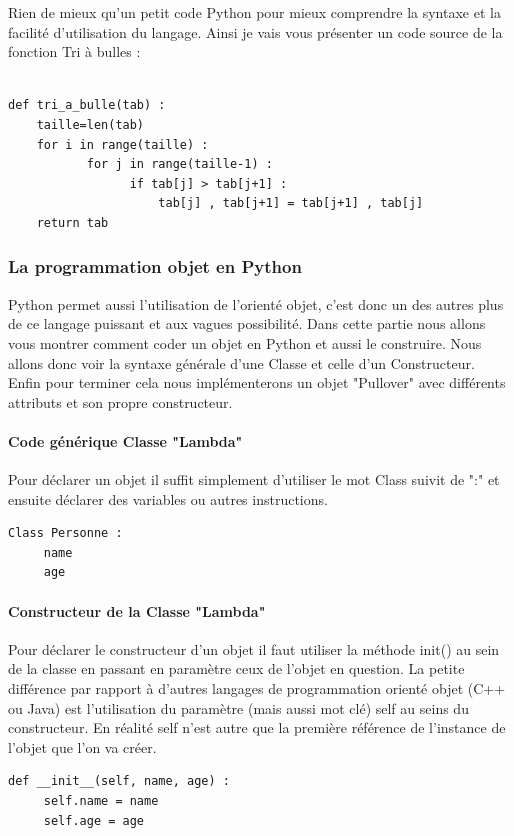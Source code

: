 \documentclass[a4paper, 12pt, twoside]{article}
\begin{document}
Rien de mieux qu'un petit code Python pour mieux comprendre la syntaxe et la facilité d'utilisation du langage. Ainsi je vais vous présenter un code source de la fonction \textsf{Tri à bulles} :

\begin{verbatim}

def tri_a_bulle(tab) :
    taille=len(tab)
    for i in range(taille) :
           for j in range(taille-1) : 
                 if tab[j] > tab[j+1] :
                     tab[j] , tab[j+1] = tab[j+1] , tab[j]
    return tab
\end{verbatim}

\subsubsection{La programmation objet en Python}
Python permet aussi l'utilisation de l'orienté objet, c'est donc un des autres plus de ce langage puissant et aux vagues possibilité. Dans cette partie nous allons vous montrer comment coder un objet en Python et aussi le construire. Nous allons donc voir la syntaxe générale d'une  \textsf{Classe} et celle d'un \textsf{Constructeur}. Enfin pour terminer cela nous implémenterons un objet "Pullover" avec différents attributs et son propre constructeur.
\paragraph{Code générique Classe "Lambda"}
Pour déclarer un objet il suffit simplement d'utiliser le mot Class suivit de ":" et ensuite déclarer des variables ou autres instructions.
\begin{verbatim}
Class Personne : 
     name
     age
\end{verbatim}
\paragraph{Constructeur de la Classe "Lambda"}{Pour déclarer le constructeur d'un objet il faut utiliser la méthode \textsf{init()} au sein de la classe en passant en paramètre ceux de l'objet en question. La petite différence par rapport à d'autres langages de programmation orienté objet (C++ ou Java) est l'utilisation du paramètre (mais aussi mot clé) \textsf{self} au seins du constructeur. En réalité \textsf{self} n'est autre que la première référence de l'instance de l'objet que l'on va créer. } 
\begin{verbatim}
def __init__(self, name, age) :
     self.name = name
     self.age = age
\end{verbatim}
\end{document}
